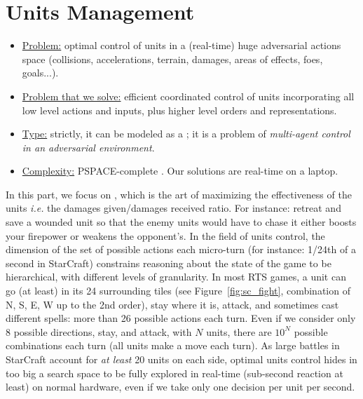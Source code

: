 \section{Units Management}
\begin{itemize}
\item \underline{Problem:} optimal control of units in a (real-time) huge adversarial actions space (collisions, accelerations, terrain, damages, areas of effects, foes, goals...).
\item \underline{Problem that we solve:} efficient coordinated control of units incorporating all low level actions and inputs, plus higher level orders and representations.
\item \underline{Type:} strictly, it can be modeled as a ; it is a problem of \textit{multi-agent control in an adversarial environment}.
\item \underline{Complexity:} PSPACE-complete \citep{Papadimitriou87,GamingComplexity}. Our solutions are real-time on a laptop.
\end{itemize}


In this part, we focus on , which is the art of maximizing the effectiveness of the units \textit{i.e.} the damages given/damages received ratio. For instance: retreat and save a wounded unit so that the enemy units would have to chase it either boosts your firepower or weakens the opponent's. 
In the field of units control, the dimension of the set of possible actions each micro-turn (for instance: 1/24th of a second in StarCraft) constrains reasoning about the state of the game to be hierarchical, with different levels of granularity. In most RTS games, a unit can go (at least) in its 24 surrounding tiles (see Figure~\ref{fig:sc_fight}, combination of N, S, E, W up to the 2nd order), 
stay where it is, attack, and sometimes cast different spells: more than 26 possible actions each turn. Even if we consider only 8 possible directions, stay, and attack, with $N$ units, there are $10^N$ possible combinations each turn (all units make a move each turn). As large battles in StarCraft account for \textit{at least} 20 units on each side, optimal units control hides in too big a search space to be fully explored in real-time (sub-second reaction at least) on normal hardware, even if we take only one decision per unit per second.

